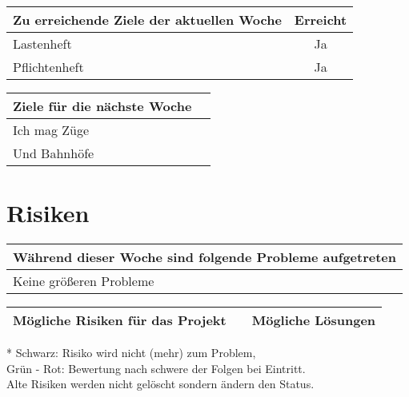 \begin{tabularx}{\textwidth}{Xc}
    \arrayrulecolor{OliveGreen}
    \toprule
    {\bfseries Zu erreichende Ziele der aktuellen Woche} & {\bfseries Erreicht} \\
    \midrule[2pt]
    Lastenheft                                           &Ja                    \\
    \rowcolor{OliveGreen!15}
    Pflichtenheft                                        &Ja                    \\
    \bottomrule[2pt]
\end{tabularx}
%
\vspace{1cm}
%
\begin{tabularx}{\textwidth}{Xc}
    \arrayrulecolor{OliveGreen}
    \toprule
    {\bfseries Ziele für die nächste Woche}              &                      \\
    \midrule[2pt]
    Ich mag Züge                                 &                      \\
    \rowcolor{OliveGreen!15}
    Und Bahnhöfe                              &                      \\
\end{tabularx}

\section*{Risiken}

\begin{tabularx}{\textwidth}{X}
    \arrayrulecolor{OliveGreen}
    \toprule
    {\bfseries Während dieser Woche sind folgende Probleme aufgetreten}         \\
    \midrule[2pt]
    Keine größeren Probleme                                                     \\
    \bottomrule[2pt]
\end{tabularx}

\vspace{1cm}

\begin{threeparttable}
    \begin{tabularx}{\textwidth}{XcX}
        \arrayrulecolor{OliveGreen}
        \toprule
        {\bfseries Mögliche Risiken für das Projekt} & {\bfseries *}  & {\bfseries Mögliche Lösungen}  \\ \midrule[2pt]
        \bottomrule[2pt]
    \end{tabularx}

    \begin{tablenotes}\footnotesize
        \item[*] Schwarz: Risiko wird nicht (mehr) zum Problem, \\
                 Grün - Rot: Bewertung nach schwere der Folgen bei Eintritt.\\
                 Alte Risiken werden nicht gelöscht sondern ändern den Status.
    \end{tablenotes}
\end{threeparttable}


